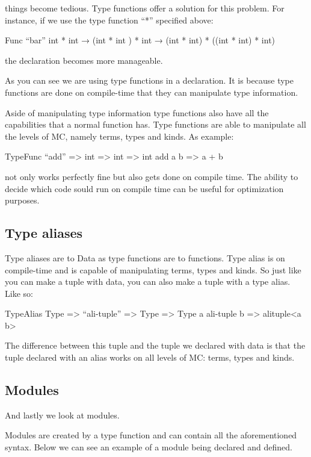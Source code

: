 things become tedious. Type functions offer a solution for this problem. For instance, if we use the type function “*” specified above:

\begin{code}
	Func “bar” int * int → (int * int ) * int → (int * int) * ((int * int) * int)
\end{code}

the declaration becomes more manageable.

As you can see we are using type functions in a declaration. It is because type functions are done on compile-time that they can manipulate type information.

Aside of manipulating type information type functions also have all the capabilities that a normal function has. Type functions are able to manipulate all the levels of MC, namely terms, types and kinds. As example:

\begin{code}
	TypeFunc “add” => int => int => int
	add a b => a + b
\end{code}

not only works perfectly fine but also gets done on compile time. The ability to decide which code sould run on compile time can be useful for optimization purposes. 

\subsection{Type aliases}

Type aliases are to Data as type functions are to functions. Type alias is on compile-time and is capable of manipulating terms, types and kinds. So just like you can make a tuple with data, you can also make a tuple with a type alias. Like so:

\begin{code}
	TypeAlias Type => “ali-tuple” => Type => Type
	a ali-tuple b => alituple<a b>
\end{code}

The difference between this tuple and the tuple we declared with data is that the tuple declared with an alias works on all levels of MC: terms, types and kinds. 


\subsection{Modules}

And lastly we look at modules.

Modules are created by a type function and can contain all the aforementioned syntax. Below we can see an example of a module being declared and defined.

